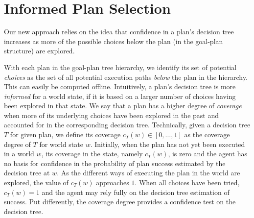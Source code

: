 \section{Informed Plan Selection}\label{sec:coverage}

Our new approach relies on the idea that confidence in a plan's
decision tree increases as more of the possible choices below the plan
(in the goal-plan structure) are explored.

With each plan in the goal-plan tree hierarchy, we identify its set of
potential \textit{choices} as the set of all potential execution paths
\textit{below} the plan in the hierarchy. This can easily be computed
offline.
Intuitively, a plan's decision tree is more \textit{informed} for a world
state, if it is based on a larger number of choices having been
explored in that state.
We say that a plan has a higher degree of \emph{coverage} when more of its
underlying choices have been explored in the past and accounted for in the
corresponding decision tree.
Technically, given a decision tree $T$ for given plan, we define its coverage
$c_T(w) \in [0,\ldots,1]$ as the coverage degree of $T$ for world state $w$.
Initially, when the plan has not yet been executed in a world $w$, its coverage
in the state, namely $c_T(w)$, is zero and the agent has no basis for
confidence in
the probability of plan success estimated by the decision tree at $w$. As the
different ways of executing the plan in the world are explored, the value of
$c_T(w)$ approaches $1$. When all choices have been tried, $c_T(w)=1$ and the
agent may rely fully on the decision tree estimation of success.
Put differently, the coverage degree provides a confidence test on the decision
tree.

